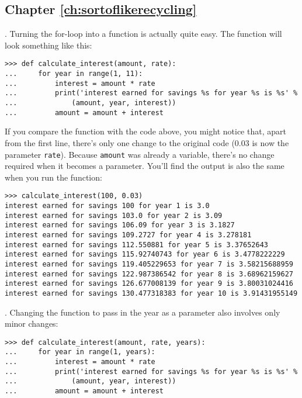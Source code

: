 \subsection*{Chapter \ref{ch:sortoflikerecycling}}

. Turning the for-loop into a function is actually quite easy.  The function will look something like this:

\begin{listing}
\begin{verbatim}
>>> def calculate_interest(amount, rate):
...     for year in range(1, 11):
...         interest = amount * rate
...         print('interest earned for savings %s for year %s is %s' % 
...             (amount, year, interest))
...         amount = amount + interest
\end{verbatim}
\end{listing}

If you compare the function with the code above, you might notice that, apart from the first line, there's only one change to the original code (0.03 is now the parameter \texttt{rate}). Because \texttt{amount} was already a variable, there's no change required when it becomes a parameter. You'll find the output is also the same when you run the function:

\begin{listing}
\begin{verbatim}
>>> calculate_interest(100, 0.03)
interest earned for savings 100 for year 1 is 3.0
interest earned for savings 103.0 for year 2 is 3.09
interest earned for savings 106.09 for year 3 is 3.1827
interest earned for savings 109.2727 for year 4 is 3.278181
interest earned for savings 112.550881 for year 5 is 3.37652643
interest earned for savings 115.92740743 for year 6 is 3.4778222229
interest earned for savings 119.405229653 for year 7 is 3.58215688959
interest earned for savings 122.987386542 for year 8 is 3.68962159627
interest earned for savings 126.677008139 for year 9 is 3.80031024416
interest earned for savings 130.477318383 for year 10 is 3.91431955149
\end{verbatim}
\end{listing}

. Changing the function to pass in the year as a parameter also involves only minor changes:

\begin{listing}
\begin{verbatim}
>>> def calculate_interest(amount, rate, years):
...     for year in range(1, years):
...         interest = amount * rate
...         print('interest earned for savings %s for year %s is %s' %
...             (amount, year, interest))
...         amount = amount + interest
\end{verbatim}
\end{listing}

